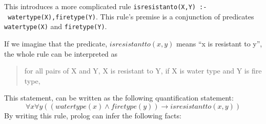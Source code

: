 This introduces a more complicated rule
\texttt{isresistanto(X,Y)\ :-\ watertype(X),firetype(Y)}. This rule's
premise is a conjunction of predicates \texttt{watertype(X)} and
\texttt{firetype(Y)}.

If we imagine that the predicate, \(isresistantto(x,y)\) means ``x is
resistant to y'', the whole rule can be interpreted as

\begin{quote}
for all pairs of X and Y, X is resistant to Y, if X is water type and Y
is fire type,
\end{quote}

This statement, can be written as the following quantification
statement: \[
\forall x \forall y ((watertype(x) \land firetype(y)) \to isresistantto(x,y))
\] By writing this rule, prolog can infer the following facts:

\begin{Shaded}
\begin{Highlighting}[]
\KeywordTok{,}
\end{Highlighting}
\end{Shaded}

\begin{Shaded}
\begin{Highlighting}[]
\end{Highlighting}
\end{Shaded}

\begin{Shaded}
\begin{Highlighting}[]
\KeywordTok{,}
\end{Highlighting}
\end{Shaded}

\begin{Shaded}
\begin{Highlighting}[]
\end{Highlighting}
\end{Shaded}

\begin{Shaded}
\begin{Highlighting}[]
\KeywordTok{,}
\end{Highlighting}
\end{Shaded}

\begin{Shaded}
\begin{Highlighting}[]
\end{Highlighting}
\end{Shaded}

